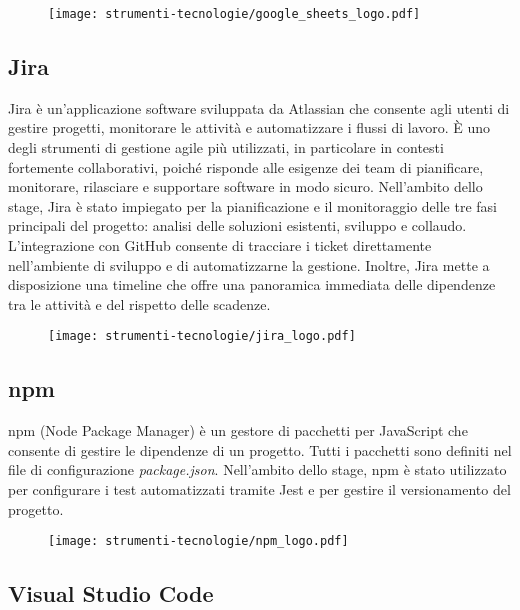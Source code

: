 \begin{figure}[H]
    \centering 
    \texttt{[image: strumenti-tecnologie/google\_sheets\_logo.pdf]} 
\end{figure}

\subsection*{Jira}

\par Jira è un'applicazione software sviluppata da Atlassian che consente agli utenti di gestire progetti, monitorare le attività e automatizzare i flussi di lavoro. È uno degli strumenti di gestione agile più utilizzati, in particolare in contesti fortemente collaborativi, poiché risponde alle esigenze dei team di pianificare, monitorare, rilasciare e supportare software in modo sicuro. Nell’ambito dello stage, Jira è stato impiegato per la pianificazione e il monitoraggio delle tre fasi principali del progetto: analisi delle soluzioni esistenti, sviluppo e collaudo. L’integrazione con GitHub consente di tracciare i ticket direttamente nell’ambiente di sviluppo e di automatizzarne la gestione. Inoltre, Jira mette a disposizione una timeline che offre una panoramica immediata delle dipendenze tra le attività e del rispetto delle scadenze.

\begin{figure}[H]
    \centering 
    \texttt{[image: strumenti-tecnologie/jira\_logo.pdf]} 
\end{figure}

\subsection*{npm}

\par npm (Node Package Manager) è un gestore di pacchetti per JavaScript che consente di gestire le dipendenze di un progetto. Tutti i pacchetti sono definiti nel file di configurazione \textit{package.json}. Nell’ambito dello stage, npm è stato utilizzato per configurare i test automatizzati tramite Jest e per gestire il versionamento del progetto.

\begin{figure}[H]
    \centering 
    \texttt{[image: strumenti-tecnologie/npm\_logo.pdf]} 
\end{figure}

\subsection*{Visual Studio Code}

